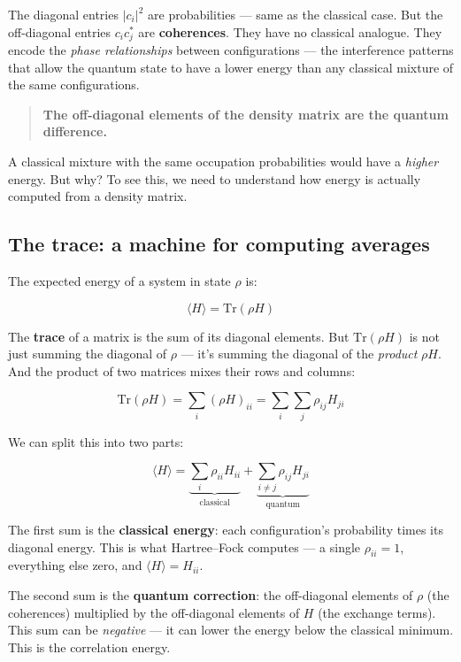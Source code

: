 \documentclass[
  11pt,
  oneside]{book}
\begin{document}
The diagonal entries \(\lvert c_i\rvert^2\) are probabilities --- same
as the classical case. But the off-diagonal entries \(c_i c_j^*\) are
\textbf{coherences}. They have no classical analogue. They encode the
\emph{phase relationships} between configurations --- the interference
patterns that allow the quantum state to have a lower energy than any
classical mixture of the same configurations.

\begin{quote}
\textbf{The off-diagonal elements of the density matrix are the quantum
difference.}
\end{quote}

A classical mixture with the same occupation probabilities would have a
\emph{higher} energy. But why? To see this, we need to understand how
energy is actually computed from a density matrix.

\subsection{The trace: a machine for computing
averages}\label{the-trace-a-machine-for-computing-averages}

The expected energy of a system in state \(\rho\) is:

\[\langle H \rangle = \text{Tr}(\rho H)\]

The \textbf{trace} of a matrix is the sum of its diagonal elements. But
\(\text{Tr}(\rho H)\) is not just summing the diagonal of \(\rho\) ---
it's summing the diagonal of the \emph{product} \(\rho H\). And the
product of two matrices mixes their rows and columns:

\[\text{Tr}(\rho H) = \sum_i (\rho H)_{ii} = \sum_i \sum_j \rho_{ij} H_{ji}\]

We can split this into two parts:

\[\langle H \rangle = \underbrace{\sum_i \rho_{ii} H_{ii}}_{\text{classical}} + \underbrace{\sum_{i \neq j} \rho_{ij} H_{ji}}_{\text{quantum}}\]

The first sum is the \textbf{classical energy}: each configuration's
probability times its diagonal energy. This is what Hartree--Fock
computes --- a single \(\rho_{ii} = 1\), everything else zero, and
\(\langle H \rangle = H_{ii}\).

The second sum is the \textbf{quantum correction}: the off-diagonal
elements of \(\rho\) (the coherences) multiplied by the off-diagonal
elements of \(H\) (the exchange terms). This sum can be \emph{negative}
--- it can lower the energy below the classical minimum. This is the
correlation energy.
\end{document}
